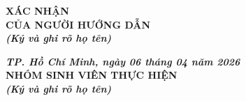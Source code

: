 \pagebreak 

\begin{table}[h]
\noindent
\begin{minipage}[t]{0.4\textwidth}
    \centering
    {\footnotesize\bfseries
    XÁC NHẬN\\
    CỦA NGƯỜI HƯỚNG DẪN\\
    \textit{(Ký và ghi rõ họ tên)}
    }
\end{minipage}
\hfill
\begin{minipage}[t]{0.55\textwidth}
    \centering
    {\footnotesize\bfseries
    \textit{TP. Hồ Chí Minh, ngày 06 tháng 04 năm 2026}\\
    NHÓM SINH VIÊN THỰC HIỆN\\
    \textit{(Ký và ghi rõ họ tên)}
    }
\end{minipage}
\end{table}